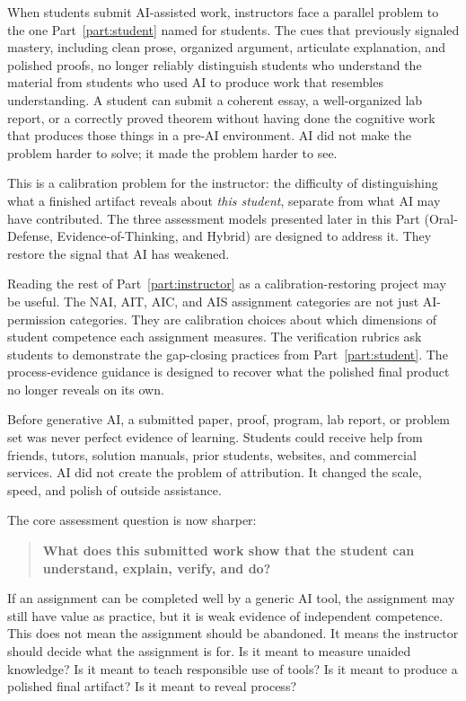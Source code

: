\documentclass{SIAMbook2023}
\begin{document}
When students submit AI-assisted work, instructors face a parallel problem to the one Part~\ref{part:student} named for students. The cues that previously signaled mastery, including clean prose, organized argument, articulate explanation, and polished proofs, no longer reliably distinguish students who understand the material from students who used AI to produce work that resembles understanding. A student can submit a coherent essay, a well-organized lab report, or a correctly proved theorem without having done the cognitive work that produces those things in a pre-AI environment. AI did not make the problem harder to solve; it made the problem harder to see.

This is a calibration problem for the instructor: the difficulty of distinguishing what a finished artifact reveals about \emph{this student}, separate from what AI may have contributed. The three assessment models presented later in this Part (Oral-Defense, Evidence-of-Thinking, and Hybrid) are designed to address it. They restore the signal that AI has weakened.

Reading the rest of Part~\ref{part:instructor} as a calibration-restoring project may be useful. The NAI, AIT, AIC, and AIS assignment categories are not just AI-permission categories. They are calibration choices about which dimensions of student competence each assignment measures. The verification rubrics ask students to demonstrate the gap-closing practices from Part~\ref{part:student}. The process-evidence guidance is designed to recover what the polished final product no longer reveals on its own.

Before generative AI, a submitted paper, proof, program, lab report, or problem set was never perfect evidence of learning. Students could receive help from friends, tutors, solution manuals, prior students, websites, and commercial services. AI did not create the problem of attribution. It changed the scale, speed, and polish of outside assistance.

The core assessment question is now sharper:

\begin{quote}
\textbf{What does this submitted work show that the student can understand, explain, verify, and do?}
\end{quote}

If an assignment can be completed well by a generic AI tool, the assignment may still have value as practice, but it is weak evidence of independent competence. This does not mean the assignment should be abandoned. It means the instructor should decide what the assignment is for. Is it meant to measure unaided knowledge? Is it meant to teach responsible use of tools? Is it meant to produce a polished final artifact? Is it meant to reveal process?
\end{document}
